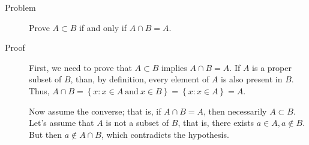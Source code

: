 \begin{description}
\item[Problem]
Prove $A \subset B$ if and only if $A \cap B = A$.

\item[Proof]

First, we need to prove that $A \subset B$ implies $A \cap B = A$. If $A$ is a
proper subset of $B$, than, by definition, every element of $A$ is also
present in $B$. Thus, $A \cap B = \left\{ x : x \in A\ \text{and}\ x \in B
\right\} = \left\{ x : x \in A \right\} = A$.

Now assume the converse; that is, if $A \cap B = A$, then necessarily $A
\subset B$. Let's assume that $A$ is not a subset of $B$, that is, there exists
$a \in A, a \not \in B$. But then $a \not \in A \cap B$, which contradicts the
hypothesis.

\end{description}
